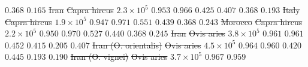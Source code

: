 \documentclass{article} %
\providecommand{\DIFdeltex}[1]{{\protect\color{red}\sout{#1}}}                      %
\providecommand{\DIFdelFL}[1]{\DIFdel{#1}} %
\providecommand{\DIFdel}[1]{\texorpdfstring{\DIFdeltex{#1}}{}} %
\begin{document}
\DIFdelFL{$ 0.368$ }%
\DIFdelFL{$ 0.165$ }%
\DIFdelFL{Iran }%
\DIFdelFL{Capra hircus }%
\DIFdelFL{$2.3\times 10^{5}$ }%
\DIFdelFL{$ 0.953$ }%
\DIFdelFL{$ 0.966$ }%
\DIFdelFL{$ 0.425$ }%
\DIFdelFL{$ 0.407$ }%
\DIFdelFL{$ 0.368$ }%
\DIFdelFL{$ 0.193$ }%
\DIFdelFL{Italy }%
\DIFdelFL{Capra hircus }%
\DIFdelFL{$1.9\times 10^{5}$ }%
\DIFdelFL{$ 0.947$ }%
\DIFdelFL{$ 0.971$ }%
\DIFdelFL{$ 0.551$ }%
\DIFdelFL{$ 0.439$ }%
\DIFdelFL{$ 0.368$ }%
\DIFdelFL{$ 0.243$ }%
\DIFdelFL{Morocco }%
\DIFdelFL{Capra hircus }%
\DIFdelFL{$2.2\times 10^{5}$ }%
\DIFdelFL{$ 0.950$ }%
\DIFdelFL{$ 0.970$ }%
\DIFdelFL{$ 0.527$ }%
\DIFdelFL{$ 0.440$ }%
\DIFdelFL{$ 0.368$ }%
\DIFdelFL{$ 0.245$ }%
\DIFdelFL{Iran }%
\DIFdelFL{Ovis aries }%
\DIFdelFL{$3.8\times 10^{5}$ }%
\DIFdelFL{$ 0.961$ }%
\DIFdelFL{$ 0.961$ }%
\DIFdelFL{$ 0.452$ }%
\DIFdelFL{$ 0.415$ }%
\DIFdelFL{$ 0.205$ }%
\DIFdelFL{$ 0.407$ }%
\DIFdelFL{Iran (O. orientalis) }%
\DIFdelFL{Ovis aries }%
\DIFdelFL{$4.5\times 10^{5}$ }%
\DIFdelFL{$ 0.964$ }%
\DIFdelFL{$ 0.960$ }%
\DIFdelFL{$ 0.420$ }%
\DIFdelFL{$ 0.445$ }%
\DIFdelFL{$ 0.193$ }%
\DIFdelFL{$ 0.190$ }%
\DIFdelFL{Iran (O. vignei) }%
\DIFdelFL{Ovis aries }%
\DIFdelFL{$3.7\times 10^{5}$ }%
\DIFdelFL{$ 0.967$ }%
\DIFdelFL{$ 0.959$ }%
\end{document}
